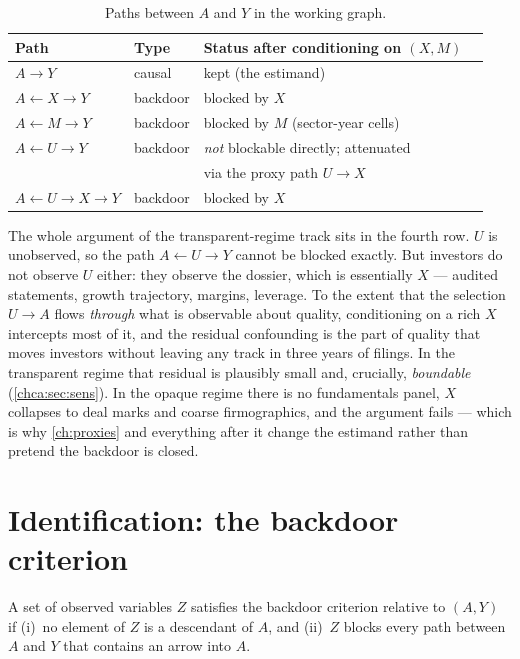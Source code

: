 \begin{table}[htbp]
\centering
\caption{Paths between $A$ and $Y$ in the working graph.}
\label{chca:tab:paths}
\begin{tabular}{@{}llll@{}}
\toprule
Path & Type & Status after conditioning on $(X, M)$ \\
\midrule
$A \to Y$ & causal & kept (the estimand) \\
$A \leftarrow X \to Y$ & backdoor & blocked by $X$ \\
$A \leftarrow M \to Y$ & backdoor & blocked by $M$ (sector-year
cells) \\
$A \leftarrow U \to Y$ & backdoor & \emph{not} blockable directly;
attenuated \\
 & & via the proxy path $U \to X$ \\
$A \leftarrow U \to X \to Y$ & backdoor & blocked by $X$ \\
\bottomrule
\end{tabular}
\end{table}

The whole argument of the transparent-regime track sits in the fourth row. $U$ is unobserved, so
the path $A \leftarrow U \to Y$ cannot be blocked exactly. But investors do not observe $U$
either: they observe the dossier, which is essentially $X$ --- audited statements, growth
trajectory, margins, leverage. To the extent that the selection $U \to A$ flows \emph{through}
what is observable about quality, conditioning on a rich $X$ intercepts most of it, and the
residual confounding is the part of quality that moves investors without leaving any track in
three years of filings. In the transparent regime that residual is plausibly small and,
crucially, \emph{boundable} (\cref{chca:sec:sens}). In the opaque regime there is no
fundamentals panel, $X$ collapses to deal marks and coarse firmographics, and the argument
fails --- which is why \cref{ch:proxies} and everything after it change the estimand rather
than pretend the backdoor is closed.

\section{Identification: the backdoor criterion}\label{chca:sec:backdoor}

\begin{definition}
\label{def:causal-backdoor} A set of observed variables $Z$ satisfies the backdoor criterion
relative to $(A, Y)$ if (i)~no element of $Z$ is a descendant of $A$, and (ii)~$Z$ blocks every
path between $A$ and $Y$ that contains an arrow into $A$.
\end{definition}

